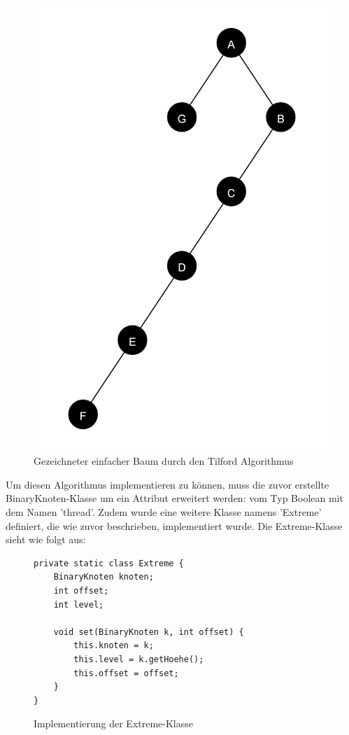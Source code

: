 \begin{figure}[H]
    \centering
    \includegraphics[scale = 0.07]{abbildungen/baum_algo_3_n2}
    \caption{Gezeichneter einfacher Baum durch den Tilford Algorithmus}
    \label{pic:baum_algo_3_n2} 
\end{figure}

Um diesen Algorithmus implementieren zu können, muss die zuvor erstellte BinaryKnoten-Klasse um ein 
Attribut erweitert werden: vom Typ Boolean mit dem Namen 'thread'. Zudem wurde eine weitere Klasse 
namens 'Extreme' definiert, die wie zuvor beschrieben, implementiert wurde. Die Extreme-Klasse sieht wie folgt aus:

\begin{figure}[H]
\begin{lstlisting}
private static class Extreme {
    BinaryKnoten knoten;
    int offset;
    int level;
    
    void set(BinaryKnoten k, int offset) {
        this.knoten = k;
        this.level = k.getHoehe();
        this.offset = offset;
    }
}
\end{lstlisting}
    \caption{Implementierung der Extreme-Klasse}
    \label{code:algo3_extreme}
\end{figure}

